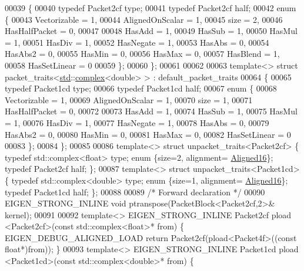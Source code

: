 \begin{DoxyCode}
00039 \{
00040   \textcolor{keyword}{typedef} Packet2cf type;
00041   \textcolor{keyword}{typedef} Packet2cf half;
00042   \textcolor{keyword}{enum} \{
00043     Vectorizable = 1,
00044     AlignedOnScalar = 1,
00045     size = 2,
00046     HasHalfPacket = 0,
00047 
00048     HasAdd    = 1,
00049     HasSub    = 1,
00050     HasMul    = 1,
00051     HasDiv    = 1,
00052     HasNegate = 1,
00053     HasAbs    = 0,
00054     HasAbs2   = 0,
00055     HasMin    = 0,
00056     HasMax    = 0,
00057     HasBlend  = 1,
00058     HasSetLinear = 0
00059   \};
00060 \};
00061 
00062 
00063 \textcolor{keyword}{template}<> \textcolor{keyword}{struct }packet\_traits<\hyperlink{namespacestd}{std}::\hyperlink{structcomplex}{complex}<double> >  : default\_packet\_traits
00064 \{
00065   \textcolor{keyword}{typedef} Packet1cd type;
00066   \textcolor{keyword}{typedef} Packet1cd half;
00067   \textcolor{keyword}{enum} \{
00068     Vectorizable = 1,
00069     AlignedOnScalar = 1,
00070     size = 1,
00071     HasHalfPacket = 0,
00072 
00073     HasAdd    = 1,
00074     HasSub    = 1,
00075     HasMul    = 1,
00076     HasDiv    = 1,
00077     HasNegate = 1,
00078     HasAbs    = 0,
00079     HasAbs2   = 0,
00080     HasMin    = 0,
00081     HasMax    = 0,
00082     HasSetLinear = 0
00083   \};
00084 \};
00085 
00086 \textcolor{keyword}{template}<> \textcolor{keyword}{struct }unpacket\_traits<Packet2cf> \{ \textcolor{keyword}{typedef} std::complex<float>  type; \textcolor{keyword}{enum} \{size=2, alignment=
      \hyperlink{group__enums_gga45fe06e29902b7a2773de05ba27b47a1af8e2bf74b04c02199f62c5e3c06dbfcc}{Aligned16}\}; \textcolor{keyword}{typedef} Packet2cf half; \};
00087 \textcolor{keyword}{template}<> \textcolor{keyword}{struct }unpacket\_traits<Packet1cd> \{ \textcolor{keyword}{typedef} std::complex<double> type; \textcolor{keyword}{enum} \{size=1, alignment=
      \hyperlink{group__enums_gga45fe06e29902b7a2773de05ba27b47a1af8e2bf74b04c02199f62c5e3c06dbfcc}{Aligned16}\}; \textcolor{keyword}{typedef} Packet1cd half; \};
00088 
00089 \textcolor{comment}{/* Forward declaration */}
00090 EIGEN\_STRONG\_INLINE \textcolor{keywordtype}{void} ptranspose(PacketBlock<Packet2cf,2>& kernel);
00091 
00092 \textcolor{keyword}{template}<> EIGEN\_STRONG\_INLINE Packet2cf pload <Packet2cf>(\textcolor{keyword}{const} std::complex<float>* from)  \{ 
      EIGEN\_DEBUG\_ALIGNED\_LOAD \textcolor{keywordflow}{return} Packet2cf(pload<Packet4f>((\textcolor{keyword}{const} \textcolor{keywordtype}{float}*)from)); \}
00093 \textcolor{keyword}{template}<> EIGEN\_STRONG\_INLINE Packet1cd pload <Packet1cd>(\textcolor{keyword}{const} std::complex<double>* from) \{ 

\end{DoxyCode}
